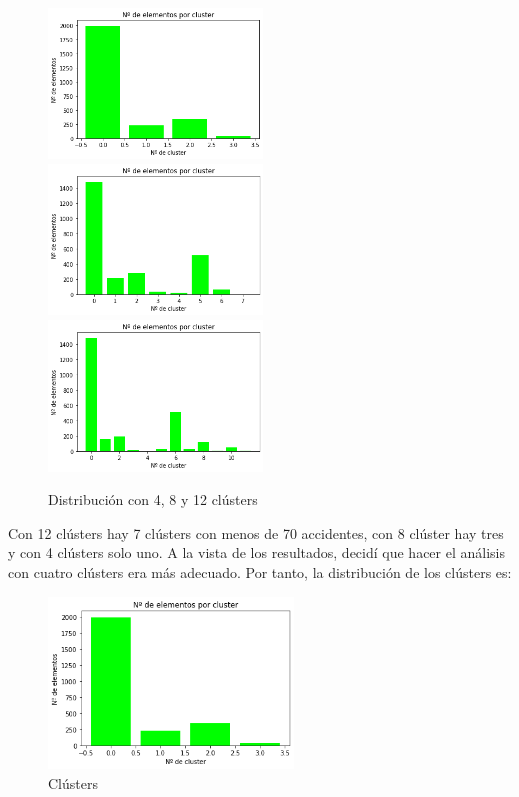 \documentclass[a4]{article}
\begin{document}
\begin{figure}[H]
  \centering
  \caption{Distribución con 4, 8 y 12 clústers}
  \includegraphics[width=57mm]{imagenes/c3_kmeans_clusters_4}
  \includegraphics[width=57mm]{imagenes/c3_kmeans_clusters_8}
  \includegraphics[width=57mm]{imagenes/c3_kmeans_clusters_12}
\end{figure}

\vspace{-3mm}

Con 12 clústers hay 7 clústers con menos de 70 accidentes, con 8 clúster hay tres y con 4 clústers solo uno. A la vista de los resultados, decidí que hacer el análisis con cuatro clústers era más adecuado. Por tanto, la distribución de los clústers es:
\vspace{-3mm}

\begin{figure}[H]
  \centering
  \caption{Clústers}
  \includegraphics[width=65mm]{imagenes/c3_kmeans_clusters_4}
\end{figure}
\end{document}
